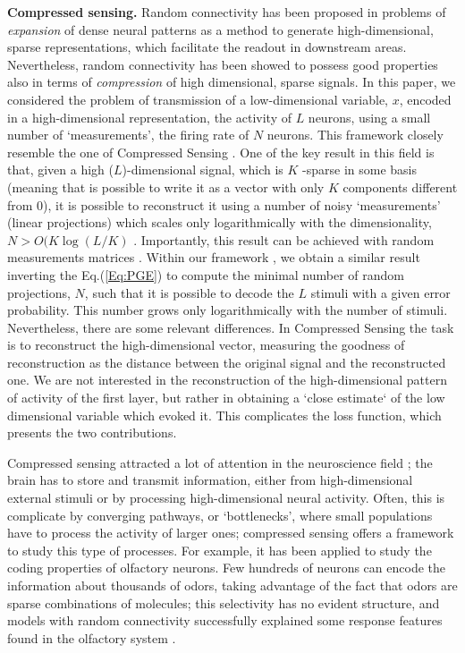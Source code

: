 \documentclass[a4paper]{article}%
\begin{document}
\textbf{Compressed sensing.} Random connectivity has been proposed in problems
of \emph{expansion} of dense neural patterns
\cite{Babadi2014SparsenessRepresentations,Barak2013FromDiscrimination,Lindsay2017HebbianCortex,Maoz2020LearningCircuits,Litwin-Kumar2017OptimalConnectivity}
as a method to generate high-dimensional, sparse representations, which
facilitate the readout in downstream areas. Nevertheless, random connectivity
has been showed to possess good properties also in terms of \emph{compression}
of high dimensional, sparse signals. In this paper, we considered the problem
of transmission of a low-dimensional variable, $x$, encoded in a
high-dimensional representation, the activity of $L$ neurons, using a small
number of `measurements', the firing rate of $N$ neurons. This framework
closely resemble the one of Compressed Sensing
\cite{Donoho2006CompressedSensing}. One of the key result in this field is
that, given a high ($L$)-dimensional signal, which is $K$ -sparse in some
basis (meaning that is possible to write it as a vector with only $K$
components different from $0$), it is possible to reconstruct it using a
number of noisy `measurements' (linear projections) which scales only
logarithmically with the dimensionality, $N > O(K \log{(L/K)}$ . Importantly,
this result can be achieved with random measurements matrices
\cite{Candes2006Near-optimalStrategies}. Within our framework , we obtain a
similar result inverting the Eq.(\ref{Eq:PGE}) to compute the minimal number
of random projections, $N$, such that it is possible to decode the $L$ stimuli
with a given error probability. This number grows only logarithmically with
the number of stimuli. Nevertheless, there are some relevant differences. In
Compressed Sensing the task is to reconstruct the high-dimensional vector,
measuring the goodness of reconstruction as the distance between the original
signal and the reconstructed one. We are not interested in the reconstruction
of the high-dimensional pattern of activity of the first layer, but rather in
obtaining a `close estimate` of the low dimensional variable which evoked it.
This complicates the loss function, which presents the two contributions.

Compressed sensing attracted a lot of attention in the neuroscience field
\cite{Ganguli2012CompressedAnalysis}; the brain has to store and transmit
information, either from high-dimensional external stimuli or by processing
high-dimensional neural activity. Often, this is complicate by converging
pathways, or `bottlenecks', where small populations have to process the
activity of larger ones; compressed sensing offers a framework to study this
type of processes. For example, it has been applied to study the coding
properties of olfactory neurons. Few hundreds of neurons can encode the
information about thousands of odors, taking advantage of the fact that odors
are sparse combinations of molecules; this selectivity has no evident
structure, and models with random connectivity successfully explained some
response features found in the olfactory system
\cite{Stettler2009RepresentationsCortex,Zhang2016ASystem,Qin2019OptimalActivity}%
.
\end{document}
